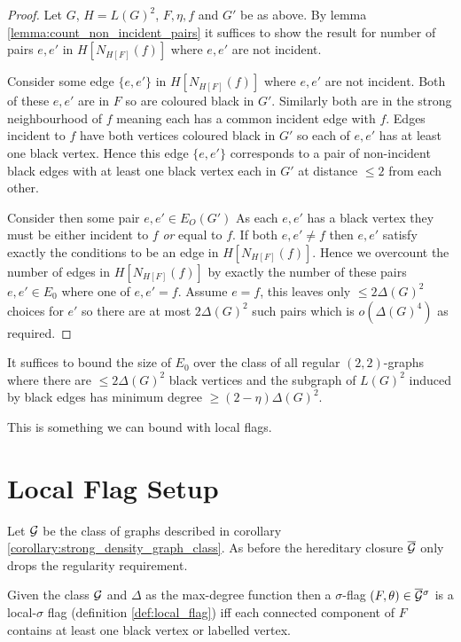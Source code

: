 \begin{proof}
    Let $G$, $H=L(G)^2$, $F, \eta, f$ and $G'$ be as above.
    By lemma \ref{lemma:count_non_incident_pairs} it suffices to show the result for
    number of pairs $e,e'$ in $H[N_{H[F]}(f)]$ where $e,e'$ are not incident.

    Consider some edge $\{e, e'\}$ in
    $H[N_{H[F]}(f)]$ where $e,e'$ are not incident.
    Both of these $e,e'$ are in $F$ so are coloured black in $G'$.
    Similarly both are in the strong neighbourhood of $f$ meaning each has a common
    incident edge with $f$. Edges incident to $f$ have both vertices coloured black
    in $G'$ so each of $e, e'$ has at least one black vertex.
    Hence this edge $\{e, e'\}$ corresponds to a pair of non-incident black edges with at least one
    black vertex each in $G'$ at distance $\leq 2$ from each other.

    Consider then some pair $e,e' \in E_O(G')$
    As each $e,e'$ has a black vertex they must be either incident to $f$ \textit{or} equal
    to $f$. If both $e, e' \neq f$ then
    $e, e'$ satisfy exactly the conditions to be an edge in $H[N_{H[F]}(f)]$.
    Hence we overcount the number of edges in $H[N_{H[F]}(f)]$ by exactly the
    number of these pairs $e, e'\in E_0$ where one of $e, e' = f$. Assume $e=f$,
    this leaves only $\leq 2\Delta(G)^2$ choices for $e'$ so there are at most
    $2\Delta(G)^2$ such pairs which is $o(\Delta(G)^4)$ as required.
\end{proof}

\begin{corollary}
    \label{corollary:strong_density_graph_class}
    It suffices to bound the size of $E_0$
    over the class of all regular $(2,2)$-graphs where there are $\leq 2\Delta(G)^2$ black
    vertices and the subgraph of $L(G)^2$ induced by black edges has minimum
    degree $\geq (2-\eta)\Delta(G)^2$.
\end{corollary}

This is something we can bound with local flags.

\section{Local Flag Setup}

Let $\mathcal{G}$ be the class of graphs described in corollary \ref{corollary:strong_density_graph_class}.
As before the hereditary closure $\overline{\mathcal{G}}$ only drops the regularity requirement.

\begin{lemma}
    Given the class $\mathcal{G}$ and $\Delta$ as the max-degree function then a
    $\sigma$-flag $(F, \theta)\in \overline{\mathcal{G}}{}^\sigma$ is a local-$\sigma$ flag (definition
    \ref{def:local_flag}) iff
    each connected component of $F$ contains at least one black vertex or labelled vertex.
\end{lemma}

